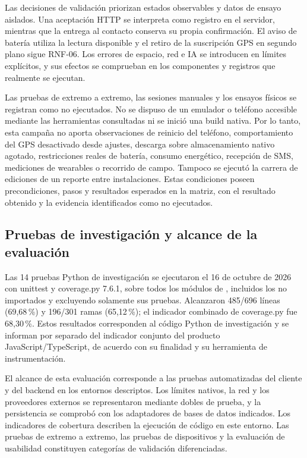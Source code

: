 Las decisiones de validación priorizan estados observables y datos de ensayo aislados. Una aceptación HTTP se interpreta como registro en el servidor, mientras que la entrega al contacto conserva su propia confirmación. El aviso de batería utiliza la lectura disponible y el retiro de la suscripción GPS en segundo plano sigue RNF-06. Los errores de espacio, red e IA se introducen en límites explícitos, y sus efectos se comprueban en los componentes y registros que realmente se ejecutan.

Las pruebas de extremo a extremo, las sesiones manuales y los ensayos físicos se registran como no ejecutados. No se dispuso de un emulador o teléfono accesible mediante las herramientas consultadas ni se inició una build nativa. Por lo tanto, esta campaña no aporta observaciones de reinicio del teléfono, comportamiento del GPS desactivado desde ajustes, descarga sobre almacenamiento nativo agotado, restricciones reales de batería, consumo energético, recepción de SMS, mediciones de wearables o recorrido de campo. Tampoco se ejecutó la carrera de ediciones de un reporte entre instalaciones. Estas condiciones poseen precondiciones, pasos y resultados esperados en la matriz, con el resultado obtenido y la evidencia identificados como no ejecutados.


\subsection{Pruebas de investigación y alcance de la evaluación}

Las 14 pruebas Python de investigación se ejecutaron el 16 de octubre de 2026 con unittest y coverage.py 7.6.1, sobre todos los módulos de , incluidos los no importados y excluyendo solamente sus pruebas. Alcanzaron 485/696 líneas (69{,}68\,\%) y 196/301 ramas (65{,}12\,\%); el indicador combinado de coverage.py fue 68{,}30\,\%. Estos resultados corresponden al código Python de investigación y se informan por separado del indicador conjunto del producto JavaScript/TypeScript, de acuerdo con su finalidad y su herramienta de instrumentación.

El alcance de esta evaluación corresponde a las pruebas automatizadas del cliente y del backend en los entornos descriptos. Los límites nativos, la red y los proveedores externos se representaron mediante dobles de prueba, y la persistencia se comprobó con los adaptadores de bases de datos indicados. Los indicadores de cobertura describen la ejecución de código en este entorno. Las pruebas de extremo a extremo, las pruebas de dispositivos y la evaluación de usabilidad constituyen categorías de validación diferenciadas.

